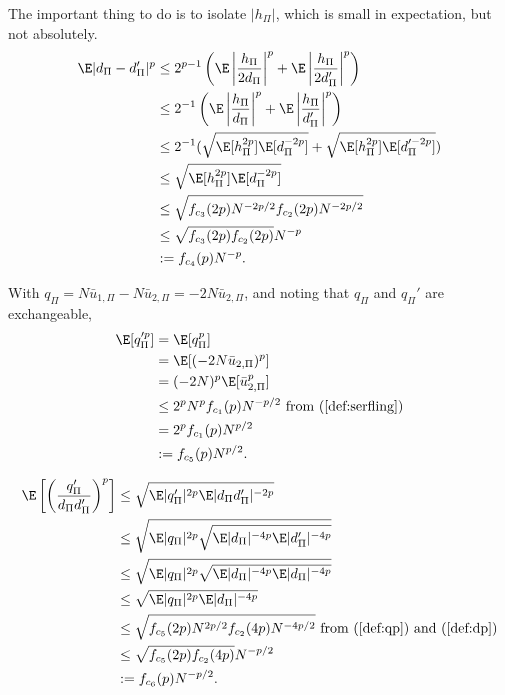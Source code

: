 The important thing to do is to isolate $|h_{\Pi}|$, which is small in
expectation, but not absolutely.
\begin{align}
  \E |d_{\Pi}-d_{\Pi}'|^p 
  &\leq 2^{p-1} \left ( \E \left | \frac{h_{\Pi}}{2d_{\Pi}} \right |^p + \E \left |
      \frac{h_{\Pi}}{2d_{\Pi}'} \right |^p \right ) \nonumber \\
  &\leq 2^{-1} \left ( \E \left | \frac{h_{\Pi}}{d_{\Pi}} \right |^p + \E \left |
      \frac{h_{\Pi}}{d_{\Pi}'} \right |^p \right ) \nonumber \\
  &\leq 2^{-1} ( \sqrt{\E[h_{\Pi}^{2p}]\E[d_{\Pi}^{-2p}]} +
  \sqrt{\E[h_{\Pi}^{2p}]\E[d_{\Pi}'^{-2p}]} ) \nonumber \\
  &\leq \sqrt{\E[h_{\Pi}^{2p}]\E[d_{\Pi}^{-2p}]} \nonumber \\
  &\leq \sqrt{f_{c_3}(2p)N^{-2p/2} f_{c_2}(2p) N^{-2p/2}} \nonumber \\
  &\leq \sqrt{f_{c_3}(2p) f_{c_2}(2p)} N^{-p} \nonumber \\
  &:= f_{c_4}(p) N^{-p} \label{def:ddiffp}.
\end{align}

With $q_{\Pi} = N\bar{u}_{1,\Pi} - N\bar{u}_{2,\Pi} = -2N\bar{u}_{2,\Pi}$, and noting that $q_{\Pi}$
and $q_{\Pi}'$ are exchangeable,
\begin{align}
  \E[q_{\Pi}'^p] 
  &= \E[q_{\Pi}^p] \nonumber \\
  &= \E[(-2N\bar{u}_{2,\Pi})^p] \nonumber \\
  &= (-2N)^p \E[\bar{u}_{2,\Pi}^p] \nonumber \\
  &\leq 2^pN^p f_{c_1}(p)N^{-p/2} \text{ from } (\ref{def:serfling}) \nonumber \\
  &= 2^p f_{c_1}(p)N^{p/2} \nonumber \\
  &:= f_{c_5}(p) N^{p/2} \label{def:qp}.
\end{align}

\begin{align}
  \E \left [ \left ( \frac{q_{\Pi}'}{d_{\Pi}d_{\Pi}'} \right )^p \right ]
  &\leq \sqrt{\E |q_{\Pi}'|^{2p} \E |d_{\Pi}d_{\Pi}'|^{-2p}} \nonumber \\
  &\leq \sqrt{\E |q_{\Pi}|^{2p} \sqrt{\E |d_{\Pi}|^{-4p} \E |d_{\Pi}'|^{-4p}}} \nonumber \\
  &\leq \sqrt{\E |q_{\Pi}|^{2p} \sqrt{\E |d_{\Pi}|^{-4p} \E |d_{\Pi}|^{-4p}}} \nonumber \\
  &\leq \sqrt{\E |q_{\Pi}|^{2p} \E |d_{\Pi}|^{-4p}} \nonumber \\ 
  &\leq \sqrt{f_{c_5}(2p) N^{2p/2} f_{c_2}(4p) N^{-4p/2}} \text{ from
  } (\ref{def:qp}) \text{ and } (\ref{def:dp}) \nonumber \\
  &\leq \sqrt{f_{c_5}(2p) f_{c_2}(4p)} N^{-p/2} \nonumber \\
  &:= f_{c_6}(p) N^{-p/2} \label{def:qpddp}.
\end{align}

